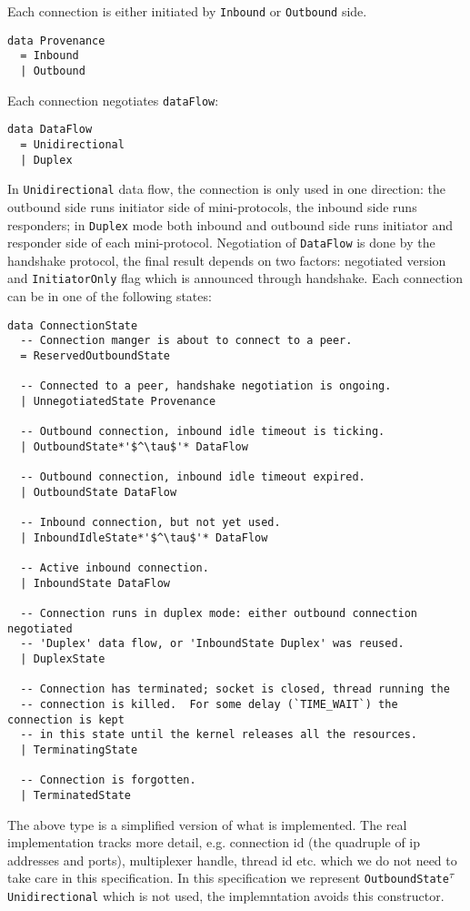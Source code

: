 \documentclass{article}
\def\OutboundStateUniTau{\texttt{OutboundState\textsuperscript{$\tau$} Unidirectional}}
\begin{document}
Each connection is either initiated by \texttt{Inbound} or \texttt{Outbound} side.
\begin{lstlisting}
data Provenance
  = Inbound
  | Outbound
\end{lstlisting}
Each connection negotiates \texttt{dataFlow}:
\begin{lstlisting}
data DataFlow
  = Unidirectional
  | Duplex
\end{lstlisting}
In \texttt{Unidirectional} data flow, the connection is only used in one direction:
the outbound side runs initiator side of mini-protocols, the inbound side runs
responders; in \texttt{Duplex} mode both inbound and outbound side runs
initiator and responder side of each mini-protocol. Negotiation of
\texttt{DataFlow} is done by the handshake protocol, the final result depends
on two factors: negotiated version and \texttt{InitiatorOnly} flag which is
announced through handshake.  Each connection can be in one of the following
states:
\begin{lstlisting}
data ConnectionState
  -- Connection manger is about to connect to a peer.
  = ReservedOutboundState

  -- Connected to a peer, handshake negotiation is ongoing.
  | UnnegotiatedState Provenance

  -- Outbound connection, inbound idle timeout is ticking.
  | OutboundState*'$^\tau$'* DataFlow

  -- Outbound connection, inbound idle timeout expired.
  | OutboundState DataFlow

  -- Inbound connection, but not yet used.
  | InboundIdleState*'$^\tau$'* DataFlow

  -- Active inbound connection.
  | InboundState DataFlow

  -- Connection runs in duplex mode: either outbound connection negotiated
  -- 'Duplex' data flow, or 'InboundState Duplex' was reused.
  | DuplexState

  -- Connection has terminated; socket is closed, thread running the
  -- connection is killed.  For some delay (`TIME_WAIT`) the connection is kept
  -- in this state until the kernel releases all the resources.
  | TerminatingState

  -- Connection is forgotten.
  | TerminatedState
\end{lstlisting}
The above type is a simplified version of what is implemented.  The real
implementation tracks more detail, e.g. connection id (the quadruple of ip
addresses and ports), multiplexer handle, thread id etc. which we do not need
to take care in this specification.  In this specification we represent
\OutboundStateUniTau{} which is not used, the implemntation avoids this
constructor.
\end{document}
